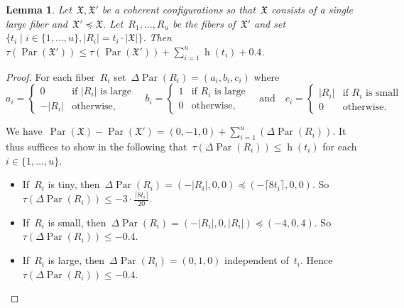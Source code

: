 \documentclass[english,a4paper]{article}
\theoremstyle{plain}
\newtheorem{lemma}      [theorem]{Lemma}
\theoremstyle{definition}
\newcommand{\coherentConfig}{\ensuremath{\mathfrak{X}}}
\newcommand{\finer}{\preccurlyeq}
\DeclareMathOperator{\hfunction}{h}
\DeclareMathOperator{\parameters}{Par}
\begin{document}
\begin{lemma}
\label{local:progress-in-large/lem}
    Let~$\coherentConfig, \coherentConfig'$ be a coherent configurations so that~$\coherentConfig$ consists of a single large fiber and~$\coherentConfig'\finer \coherentConfig$.
    Let~$R_1,\ldots,R_u$ be the fibers of~$\coherentConfig'$ and set~$\{t_i \mid i \in\{1,\ldots,u\}, |R_i|= t_i \cdot|\coherentConfig| \}$.
    Then~$\tau(\parameters(\coherentConfig'))\leq \tau(\parameters(\coherentConfig'))+\sum_{i = 1}^{u} \hfunction(t_i)+0.4$.
\end{lemma}
\begin{proof}
    For each  fiber~$R_i$ set~$\Delta \parameters(R_i)=
    (a_i,b_i,c_i)$ where~
    \[
        a_i= \begin{cases}
            0        & \text{if~$|R_i|$ is large}\\
            -|R_i|   & \text{otherwise,}
        \end{cases} \quad
        b_i=\begin{cases}
            1       & \text{if~$R_i$ is large} \\
            0       & \text{otherwise,}
        \end{cases}
        \quad\text{and}\quad
        c_i =\begin{cases}
            |R_i|   & \text{if~$R_i$ is small}\\
            0       & \text{otherwise.}
        \end{cases}
    \]

    We have~$\parameters(\coherentConfig)- \parameters(\coherentConfig')= (0,-1,0)+\sum_{i=1}^{u} (\Delta \parameters(R_i))$. It thus suffices to show in the following that~$\tau(\Delta \parameters(R_i))\leq \hfunction(t_i)$ for each~$i\in \{1,\ldots,u\}$.
    \begin{itemize}
        \item
        If~$R_i$ is tiny, then~$\Delta \parameters(R_i) = (-|R_i|,0,0)\preceq (-\lceil 8t_i\rceil,0,0)$.
        So~$\tau(\Delta \parameters(R_i))\leq -3\cdot \frac{\lceil 8t_i\rceil }{20}$.
        \item
        If~$R_i$ is small, then~$\Delta \parameters(R_i) = (-|R_i|,0,|R_i|) \preceq (-4,0,4)$.
        So~$\tau(\Delta \parameters(R_i))\leq -0.4$.
        \item
        If~$R_i$ is large, then~$\Delta \parameters(R_i) = (0,1,0)$ independent of~$t_i$.
        Hence~$\tau(\Delta \parameters(R_i))\leq -0.4$.
        \qedhere
    \end{itemize}
\end{proof}
\end{document}
